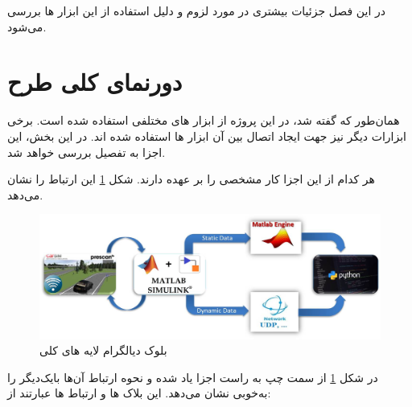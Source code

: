 در این فصل جزئیات بیشتری در مورد لزوم و دلیل استفاده از این ابزار ها بررسی می‌شود.


\section{دورنمای کلی طرح}
همان‌طور که گفته شد، در این پروژه از ابزار های مختلفی استفاده شده است. برخی ابزارات دیگر نیز جهت ایجاد اتصال بین آن ابزار ها استفاده شده اند. در این بخش، این اجزا به تفصیل بررسی خواهد شد.
 
 هر کدام از این اجزا کار مشخصی را بر عهده دارند.
 شکل  
\ref{fig:block-diagram}
این ارتباط را نشان می‌دهد.

\begin{figure}[h!]
	\centering
	\includegraphics[width=1\linewidth]{Figures/block-diagram-white}
	\caption{بلوک دیالگرام لایه های کلی}
	\label{fig:block-diagram}
\end{figure}

در شکل 
\ref{fig:block-diagram}
از سمت چپ به راست اجزا یاد شده و نحوه ارتباط آن‌ها با‌یک‌دیگر را به‌خوبی نشان می‌دهد. این بلاک ها و ارتباط ها عبارتند از:


